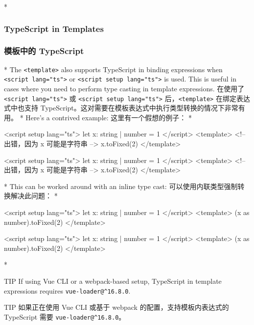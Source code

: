 \begin{paracol}{2} 
 
\switchcolumn[0]*%
\subsubsection{TypeScript in Templates}
\switchcolumn
\subsubsection{模板中的 TypeScript}
\switchcolumn[0]*%
The \texttt{\textless{}template\textgreater{}} also supports TypeScript
in binding expressions when
\texttt{\textless{}script\ lang="ts"\textgreater{}} or
\texttt{\textless{}script\ setup\ lang="ts"\textgreater{}} is used. This
is useful in cases where you need to perform type casting in template
expressions.
\switchcolumn
在使用了 \texttt{\textless{}script\ lang="ts"\textgreater{}} 或
\texttt{\textless{}script\ setup\ lang="ts"\textgreater{}}
后，\texttt{\textless{}template\textgreater{}} 在绑定表达式中也支持
TypeScript。这对需要在模板表达式中执行类型转换的情况下非常有用。
\switchcolumn[0]*%
Here's a contrived example:
\switchcolumn
这里有一个假想的例子：
\switchcolumn[0]*%
\begin{codeHtml}
<script setup lang="ts">
let x: string | number = 1
</script>
<template>
  <!-- 出错，因为 x 可能是字符串 -->
  {{ x.toFixed(2) }}
</template>
\end{codeHtml}
\switchcolumn
\begin{codeHtml}
<script setup lang="ts">
let x: string | number = 1
</script>
<template>
  <!-- 出错，因为 x 可能是字符串 -->
  {{ x.toFixed(2) }}
</template>
\end{codeHtml}
\switchcolumn[0]*%
This can be worked around with an inline type cast:
\switchcolumn
可以使用内联类型强制转换解决此问题：
\switchcolumn[0]*%
\begin{codeHtml}
<script setup lang="ts">
let x: string | number = 1
</script>
<template>
  {{ (x as number).toFixed(2) }}
</template>
\end{codeHtml}
\switchcolumn
\begin{codeHtml}
<script setup lang="ts">
let x: string | number = 1
</script>
<template>
  {{ (x as number).toFixed(2) }}
</template>
\end{codeHtml}
\switchcolumn[0]*%
\begin{vueQuote}{TIP}
If using Vue CLI or a webpack-based setup, TypeScript in template
expressions requires \texttt{vue-loader@\^{}16.8.0}.
\end{vueQuote} 
\switchcolumn
\begin{vueQuote}{TIP}
如果正在使用 Vue CLI 或基于 webpack 的配置，支持模板内表达式的
TypeScript 需要 \texttt{vue-loader@\^{}16.8.0}。
\end{vueQuote} 
\end{paracol}



